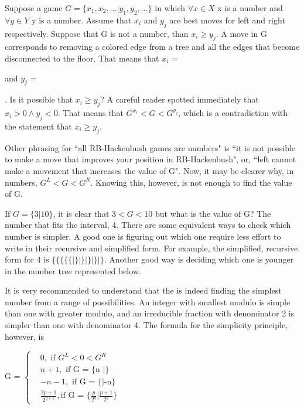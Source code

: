Suppose a game $G = \{x_1, x_2,... | y_1, y_2, ...\}$ in which $\forall x \in X$ x  is a number and $\forall y \in Y$ y is a number. Assume that $x_i$ and $y_j$ are best moves for left and right respectively. Suppose that G is not a number, than $x_i \ge y_j$. A move in G corresponds to removing a colored edge from a tree and all the edges that become disconnected to the floor. That means that $x_i$ = 
 and $y_j$ =
. Is it possible that $x_i \ge y_j$? A careful reader spotted immediately that $x_i > 0 \land y_j < 0$. That means that $G^{x_i} < G < G^{y_j}$, which is a contradiction with the statement that $x_i \ge y_j$.

Other phrasing for ``all RB-Hackenbush games are numbers" is ``it is not possible to make a move that improves your position in  RB-Hackenbush", or, ``left cannot make a movement that increases the value of G". Now, it may be clearer why, in numbers, $G^L < G < G^R$. Knowing this, however, is not enough to find the value of G.

If $G = \{3 | 10\}$, it is clear that $3 < G < 10$ but what is the value of G? The  number that fits the interval, 4. There are some equivalent ways to check which number is simpler. A good one is figuring out which one require less effort to write in their recursive and simplified form. For example, the simplified, recursive form for 4 is $\{\{\{\{\{|\}|\}|\}|\} | \}$. Another good way is deciding which one is younger in the number tree represented below.



It is very recommended to understand that the  is indeed finding the simplest number from a range of possibilities. An integer with smallest modulo is simple than one with greater modulo, and an irreducible fraction with denominator 2 is simpler than one with denominator 4. The formula for the simplicity principle, however, is 

G = 
$
\begin{cases}
	&0, \text{ if $G^L < 0 < G^R$}\\
	&n+1, \text{ if G = \{n $|$\}}\\
	&-n-1, \text{ if G = \{$|$-n\}}\\
	&\frac{2p + 1}{2^{q+1}}, \text{if G = $\{\frac{p}{2^q} | \frac{p+1}{2^q}\}$}
\end{cases}
$

